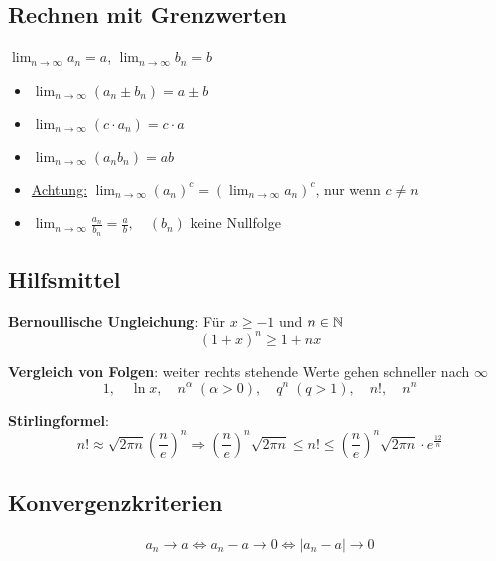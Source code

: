 \subsection{Rechnen mit Grenzwerten}
$\lim_{n \to \infty} a_n = a$, $\lim_{n \to \infty} b_n = b$
\begin{itemize}
  \item $\lim_{n \to \infty} (a_n \pm b_n) = a \pm b$
  \item $\lim_{n \to \infty} (c \cdot a_n) = c \cdot a$
  \item $\lim_{n \to \infty} (a_n b_n) = ab$
  \item \underline{Achtung:} $\lim_{n \to \infty} (a_n)^c = (\lim_{n \to
  \infty} a_n)^c$, nur wenn $c \neq n$
  \item $\lim_{n \to \infty} \frac{a_n}{b_n} = \frac{a}{b}, \quad (b_n)$ keine
  Nullfolge
\end{itemize}

\subsection{Hilfsmittel}
\textbf{Bernoullische Ungleichung}: Für $x \geq -1$ und $n \in \mathbb{N}$
\[
	(1+x)^n \geq 1 + nx
\]


\textbf{Vergleich von Folgen}: weiter rechts stehende Werte gehen schneller nach
$\infty$
\[
	1, \quad \ln x, \quad n^\alpha \; (\alpha > 0), \quad q^n \; (q > 1), \quad n!,
	\quad n^n
\]

\textbf{Stirlingformel}:
\[
	n! \approx \sqrt{2 \pi n} \left (\frac{n}{e} \right )^n
	\Rightarrow \left ( \frac{n}{e} \right )^n \sqrt{2 \pi n} \leq n! \leq \left (
	\frac{n}{e} \right )^n \sqrt{2 \pi n} \cdot e^\frac{12}{n}
\]

\subsection{Konvergenzkriterien}
\begin{align*}
	a_n \to a \Leftrightarrow a_n - a \to 0 \Leftrightarrow |a_n - a| \to 0
\end{align*}
	
